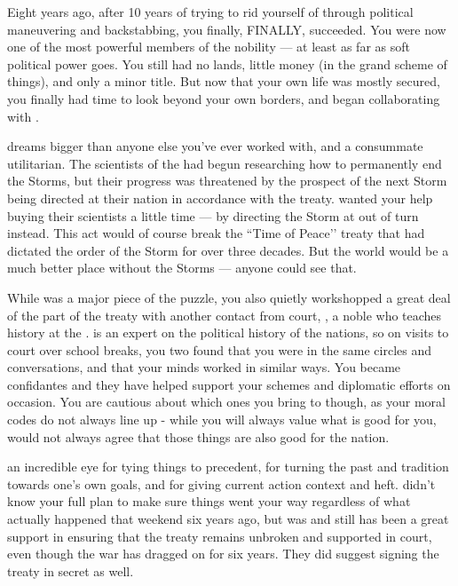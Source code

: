 \documentclass[char]{GL2020}
\begin{document}
Eight years ago, after 10 years of trying to rid yourself of \cEvilNemesis{} through political maneuvering and backstabbing, you finally, FINALLY, succeeded. You were now one of the most powerful members of the \pFarm{} nobility — at least as far as soft political power goes. You still had no lands, little money (in the grand scheme of things), and only a minor title. But now that your own life was mostly secured, you finally had time to look beyond your own borders, and began collaborating with \cDiplomat{\full}. 

\cDiplomat{} dreams bigger than anyone else you’ve ever worked with, and \cDiplomat{\they} \cDiplomat{\are} a consummate utilitarian. The scientists of the \pTech{} had begun researching how to permanently end the Storms, but their progress was threatened by the prospect of the next Storm being directed at their nation in accordance with the treaty. \cDiplomat{} wanted your help buying their scientists a little time — by directing the Storm at \pShip{} out of turn instead. This act would of course break the ``Time of Peace’’ treaty that had dictated the order of the Storm for over three decades. But the world would be a much better place without the Storms — anyone could see that.  

While \cDiplomat{} was a major piece of the puzzle, you also quietly workshopped a great deal of the \pFarm{} part of the treaty with another contact from court, \cHistory{\full}, a noble who teaches history at the \pSchool{}. \cHistory{} is an expert on the political history of the nations, so on \cHistory{\their} visits to court over school breaks, you two found that you were in the same circles and conversations, and that your minds worked in similar ways. You became confidantes and they have helped support your schemes and diplomatic efforts on occasion. You are cautious about which ones you bring to \cHistory{\them} though, as your moral codes do not always line up - while you will always value what  is good for you, \cHistory{} would not always agree that those things are also good for the nation.

 \cHistory{\They \have} an incredible eye for tying things to precedent, for turning the past and tradition towards one’s own goals, and for giving current action context and heft.  \cHistory{} didn’t know your full plan to make sure things went your way regardless of what actually happened that weekend six years ago, but was and still has been a great support in ensuring that the treaty remains unbroken and supported in court, even though the war has dragged on for six years.  They did suggest signing the treaty in secret as well.
\end{document}
